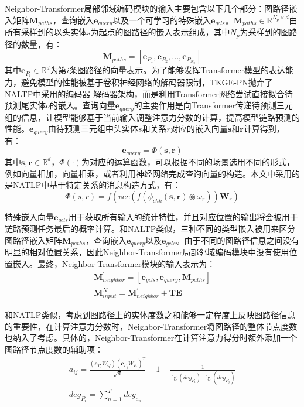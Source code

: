 Neighbor-Transformer局部邻域编码模块的输入主要包含以下几个部分：图路径嵌入矩阵$\mathbf{M}_{paths}$，查询嵌入$\boldsymbol{e}_{query}$以及一个可学习的特殊嵌入$\boldsymbol{e}_{gcls}$。$\mathbf{M}_{paths}\in\mathbb{R}^{N_p\times d}$由所有采样到的以头实体$s$为起点的图路径的嵌入表示组成，其中$N_p$为采样到的图路径的数量，有：
\begin{equation}
  \mathbf{M}_{paths}=\left[ \boldsymbol{e}_{P_1},\boldsymbol{e}_{P_2},...,\boldsymbol{e}_{P_{N_p}}\right]
\end{equation}
其中$\boldsymbol{e}_{P_i} \in \mathbb{R}^d$为第$i$条图路径的向量表示。为了能够发挥Transformer模型的表达能力，避免模型的性能被基于卷积神经网络的解码器限制，TKGE-PN抛弃了NALTP中采用的编码器-解码器架构，而是利用Transformer网络尝试直接拟合待预测尾实体$o$的嵌入。查询向量$\boldsymbol{e}_{query}$的主要作用是向Transformer传递待预测三元组的信息，让模型能够基于当前输入调整注意力分数的计算，提高模型链路预测的性能。$\boldsymbol{e}_{query}$由待预测三元组中头实体$s$和关系$r$对应的嵌入向量$\boldsymbol{s}$和$\boldsymbol{r}$计算得到，有：
\begin{equation}
  \boldsymbol{e}_{query}=\varPhi(\boldsymbol{s},\boldsymbol{r})
\end{equation}
其中$\boldsymbol{s},\boldsymbol{r}\in\mathbb{R}^d$，$\varPhi(\cdot)$为对应的运算函数，可以根据不同的场景选用不同的形式，例如向量相加，向量相乘，或者利用神经网络完成查询向量的构造。本文中采用的是NATLP中基于特定关系的消息构造方式，有：
\begin{equation}
  \varPhi \left(s,r\right) = f\left(vec\left(f\left(\phi_{chk}\left(\boldsymbol{s},\boldsymbol{r}\right) \circledast \omega_{r} \right)\right)\mathbf{W}_{r}\right)
\end{equation}

特殊嵌入向量$\mathbf{e}_{gcls}$用于获取所有输入的统计特性，并且对应位置的输出将会被用于链路预测任务最后的概率计算。和NALTP类似，三种不同的类型嵌入被用来区分图路径嵌入矩阵$\mathbf{M}_{paths}$，查询嵌入$\boldsymbol{e}_{query}$以及$\boldsymbol{e}_{gcls}$。由于不同的图路径信息之间没有明显的相对位置关系，因此Neighbor-Transformer局部邻域编码模块中没有使用位置嵌入。最终，Neighbor-Transformer模块的输入表示为：
\begin{gather}
  \mathbf{M}_{neighbor}^{\prime}=[\boldsymbol{e}_{gcls},\boldsymbol{e}_{query},\mathbf{M}_{paths}]\\
  \mathbf{M}_{input}^{N}=\mathbf{M}_{neighbor}^{\prime}+\mathbf{TE}
\end{gather}

和NATLP类似，考虑到图路径上的实体度数之和能够一定程度上反映图路径信息的重要性，在计算注意力分数时，Neighbor-Transformer将图路径的整体节点度数也纳入了考虑。具体的，Neighbor-Transformer在计算注意力得分时额外添加一个图路径节点度数的辅助项：
\begin{gather}
  a_{ij}=\frac{(\boldsymbol{e}_{P_i}W_Q)(\boldsymbol{e}_{P_j}W_K)^T}{\sqrt{d}}+1-\frac{1}{\lg (deg_{P_i})\cdot \lg (deg_{P_j})}\\
  deg_{P_i}=\sum_{n = 1}^{T}  deg_{e_n}
\end{gather}

